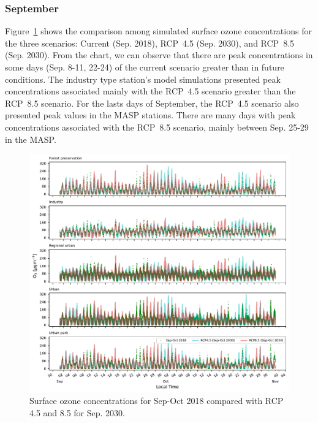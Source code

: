 \subsubsection{September}
Figure~\ref{fig:o3_changes} shows the comparison among simulated surface ozone concentrations for the three scenarios: Current (Sep. 2018), RCP~4.5 (Sep. 2030), and RCP~8.5 (Sep. 2030).
From the chart, we can observe that there are peak concentrations in some days (Sep. 8-11, 22-24) of the current scenario greater than in future conditions.
The industry type station's model simulations presented peak concentrations associated mainly with the RCP~4.5 scenario greater than the RCP~8.5 scenario.
For the lasts days of September, the RCP~4.5 scenario also presented peak values in the MASP stations.
There are many days with peak concentrations associated with the RCP~8.5 scenario, mainly between Sep. 25-29 in the MASP.

\begin{figure}[!hbt]
\begin{center}
  \includegraphics[width=1.05\textwidth]{fig/rcp_2030_subplot_o3}
\end{center}
  \caption{Surface ozone concentrations for Sep-Oct 2018 compared with RCP 4.5 and 8.5 for Sep. 2030.}
  \label{fig:o3_changes}
\end{figure}

